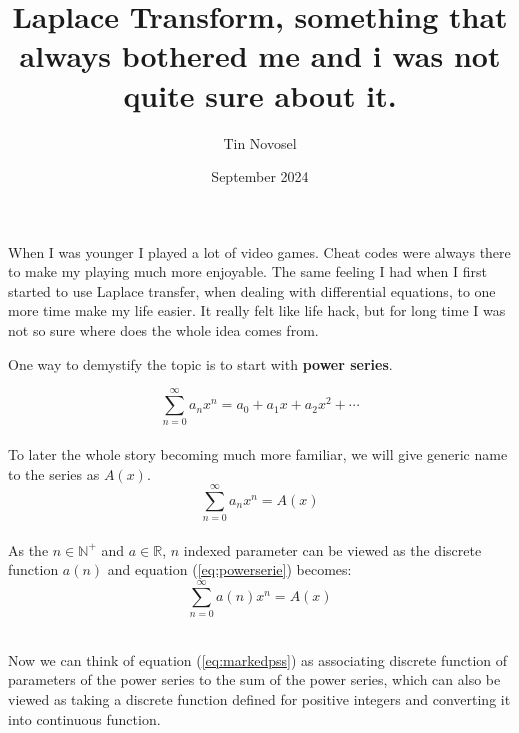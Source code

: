 \documentclass{article}
\title{Laplace Transform, something that always bothered me and i was not quite sure about it.}
\author{Tin Novosel}
\date{September 2024}
\begin{document}
\maketitle

When I was younger I played a lot of video games. Cheat codes were always there to make my playing much more enjoyable. The same feeling I had when I first started to use Laplace transfer, when dealing with differential equations, to one more time make my life easier. It really felt like life hack, but for long time I was not so sure where does the whole idea comes from.
\vspace{1cm}

\noindent One way to demystify the topic is to start with \textbf{power series}.

\begin{equation}
\label{eq:powerserie}
    \sum_{n=0}^{\infty} a_n x^n = a_0 + a_1 x + a_2 x^2 + \cdots
\end{equation}\\
 \noindent To later the whole story becoming much more familiar, we will give generic name to the series as $A(x)$.\\

 \begin{equation}
 \label{eq:markedps}
     \sum_{n=0}^{\infty} a_n x^n = A(x)
 \end{equation}\\

 \noindent As the $n \in \mathbb{N^+}$ and $a \in \mathbb{R}$, $n$ indexed parameter can be viewed as the discrete function $a(n)$ and equation (\ref{eq:powerserie}) becomes:\\
 
 \begin{equation}
 \label{eq:markedpss}
     \sum_{n=0}^{\infty} a(n) x^n = A(x)
 \end{equation}\\

\newpage

\noindent Now we can think of equation (\ref{eq:markedpss}) as associating discrete function of parameters of the power series to the sum of the power series, which can also be viewed as taking a discrete function defined for positive integers and converting it into continuous function.\\
\end{document}
